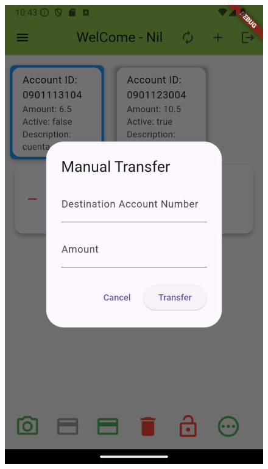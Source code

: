 \documentclass[a4paper,12pt,twoside]{ThesisStyle}
\begin{document}
\begin{figure}[h]
    \begin{minipage}{0.30\textwidth}
        \centering
        \includegraphics[width=\textwidth]{imatges/otherOperation1.png}
    \end{minipage}
    \begin{minipage}{0.30\textwidth}
        \centering

\end{minipage}
\end{figure}
\end{document}

